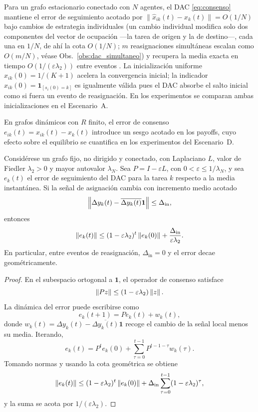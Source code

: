 \begin{observacion}
\label{obs:init_obs}
Para un grafo estacionario conectado con $N$ agentes, el DAC \eqref{eq:consenso}
mantiene el error de seguimiento acotado por $\|\hat{x}_{ik}(t) - x_k(t)\| = O(1/N)$
bajo cambios de estrategia individuales (un cambio individual modifica solo dos
componentes del vector de ocupación —la tarea de origen y la de destino—, cada una en
$1/N$, de ahí la cota $O(1/N)$; $m$ reasignaciones simultáneas escalan como $O(m/N)$,
véase Obs.~\ref{obs:dac_simultaneo}) y recupera la media exacta en tiempo
$O(1/(\varepsilon\lambda_2))$ entre eventos \citep{kia2019tutorial}.
La inicialización uniforme $\hat{x}_{ik}(0) = 1/(K+1)$ acelera la convergencia inicial;
la indicador $\hat{x}_{ik}(0) = \mathbf{1}_{[s_i(0)=k]}$ es igualmente válida
pues el DAC absorbe el salto inicial como si fuera un evento de reasignación.
En los experimentos se comparan ambas inicializaciones en el Escenario~A.
\end{observacion}
En grafos dinámicos con $R$ finito, el error de consenso $e_{ik}(t) = \hat{x}_{ik}(t)
- x_k(t)$ introduce un sesgo acotado en los payoffs, cuyo efecto sobre el equilibrio
se cuantifica en los experimentos del Escenario~D.

\begin{lema}
\label{lema:dac_finito}
Considérese un grafo fijo, no dirigido y conectado, con Laplaciano $L$, valor de
Fiedler $\lambda_2>0$ y mayor autovalor $\lambda_N$. Sea $P=I-\varepsilon L$, con
$0<\varepsilon\le1/\lambda_N$, y sea $e_k(t)$ el error de seguimiento del DAC para la
tarea $k$ respecto a la media instantánea. Si la señal de asignación cambia con
incremento medio acotado
\[
  \left\|\Delta y_k(t)-\overline{\Delta y_k(t)}\mathbf{1}\right\|\le \Delta_{\mathrm{in}},
\]
entonces
\begin{equation}
  \left\|e_k(t)\right\|
  \le
  (1-\varepsilon\lambda_2)^t\left\|e_k(0)\right\|
  +
  \frac{\Delta_{\mathrm{in}}}{\varepsilon\lambda_2}.
  \label{eq:dac_cota_finita}
\end{equation}
En particular, entre eventos de reasignación, $\Delta_{\mathrm{in}}=0$ y el error
decae geométricamente.
\end{lema}

\begin{proof}
En el subespacio ortogonal a $\mathbf{1}$, el operador de consenso satisface
\[
  \left\|Pz\right\|\le (1-\varepsilon\lambda_2)\left\|z\right\|.
\]
La dinámica del error puede escribirse como
\[
  e_k(t+1)=Pe_k(t)+w_k(t),
\]
donde $w_k(t)=\Delta y_k(t)-\overline{\Delta y_k(t)}\mathbf{1}$ recoge el cambio de
la señal local menos su media. Iterando,
\[
  e_k(t)=P^te_k(0)+\sum_{\tau=0}^{t-1}P^{t-1-\tau}w_k(\tau).
\]
Tomando normas y usando la cota geométrica se obtiene
\[
  \left\|e_k(t)\right\|
  \le
  (1-\varepsilon\lambda_2)^t\left\|e_k(0)\right\|
  +
  \Delta_{\mathrm{in}}
  \sum_{\tau=0}^{t-1}(1-\varepsilon\lambda_2)^\tau,
\]
y la suma se acota por $1/(\varepsilon\lambda_2)$.
\end{proof}

